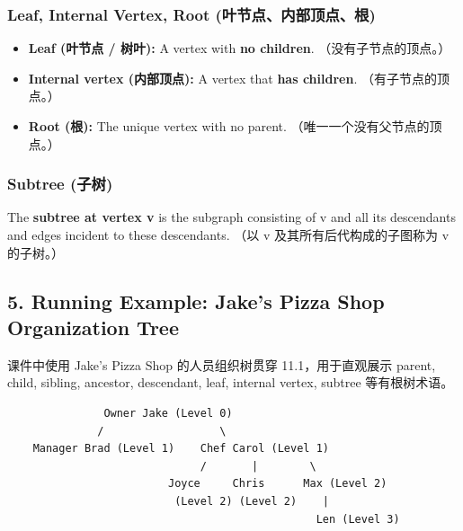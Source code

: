 \documentclass[10pt,a4paper,openany]{ctexbook}
\theoremstyle{definition}
\theoremstyle{remark}
\begin{document}
\subsubsection{Leaf, Internal Vertex, Root (叶节点、内部顶点、根)}

\begin{itemize}
\item \textbf{Leaf (叶节点 / 树叶):} A vertex with \textbf{no children}. （没有子节点的顶点。）
\item \textbf{Internal vertex (内部顶点):} A vertex that \textbf{has children}. （有子节点的顶点。）
\item \textbf{Root (根):} The unique vertex with no parent. （唯一一个没有父节点的顶点。）

\end{itemize}

\subsubsection{Subtree (子树)}

The \textbf{subtree at vertex v} is the subgraph consisting of v and all its descendants and edges incident to these descendants. （以 v 及其所有后代构成的子图称为 v 的子树。）
\vspace{-2pt}

\subsection{5. Running Example: Jake's Pizza Shop Organization Tree}

课件中使用 Jake's Pizza Shop 的人员组织树贯穿 11.1，用于直观展示 parent, child, sibling, ancestor, descendant, leaf, internal vertex, subtree 等有根树术语。
{\footnotesize\begin{verbatim}
               Owner Jake (Level 0)
              /                  \
    Manager Brad (Level 1)    Chef Carol (Level 1)
                              /       |        \
                         Joyce     Chris      Max (Level 2)
                          (Level 2) (Level 2)    |
                                                Len (Level 3)
\end{verbatim}}
\end{document}
